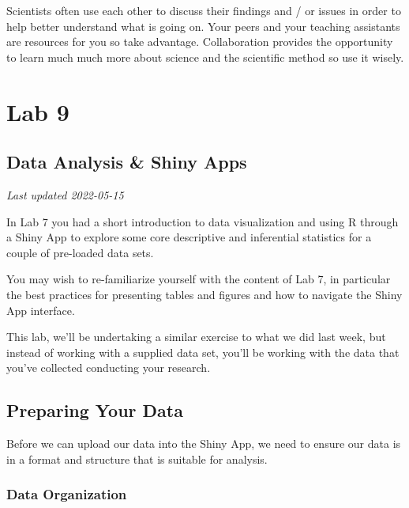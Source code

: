 \documentclass[
]{book}
\begin{document}
Scientists often use each other to discuss their findings and / or issues in order to help better understand what is going on. Your peers and your teaching assistants are resources for you so take advantage. Collaboration provides the opportunity to learn much much more about science and the scientific method so use it wisely.

\hypertarget{part-lab-9}{%
\part*{Lab 9}\label{part-lab-9}}

\hypertarget{data-analysis-shiny-apps}{%
\chapter*{Data Analysis \& Shiny Apps}\label{data-analysis-shiny-apps}}

\emph{Last updated 2022-05-15}

In Lab 7 you had a short introduction to data visualization and using R through a Shiny App to explore some core descriptive and inferential statistics for a couple of pre-loaded data sets.

You may wish to re-familiarize yourself with the content of Lab 7, in particular the best practices for presenting tables and figures and how to navigate the Shiny App interface.

This lab, we'll be undertaking a similar exercise to what we did last week, but instead of working with a supplied data set, you'll be working with the data that you've collected conducting your research.

\hypertarget{preparing-your-data}{%
\chapter*{Preparing Your Data}\label{preparing-your-data}}

Before we can upload our data into the Shiny App, we need to ensure our data is in a format and structure that is suitable for analysis.

\hypertarget{data-organization}{%
\section*{Data Organization}\label{data-organization}}
\end{document}
